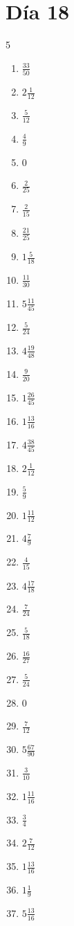 \documentclass[12pt]{article}
\begin{document}
\section*{Día 18}
\begin{multicols}{5}\begin{enumerate}
\item $ \frac{33}{50} $
\item $ 2 \frac{1}{12} $
\item $ \frac{5}{12} $
\item $ \frac{4}{9} $
\item $ 0 $
\item $ \frac{2}{25} $
\item $ \frac{2}{15} $
\item $ \frac{21}{25} $
\item $ 1 \frac{5}{18} $
\item $ \frac{11}{30} $
\item $ 5 \frac{11}{45} $
\item $ \frac{5}{24} $
\item $ 4 \frac{19}{48} $
\item $ \frac{9}{20} $
\item $ 1 \frac{26}{45} $
\item $ 1 \frac{13}{16} $
\item $ 4 \frac{38}{45} $
\item $ 2 \frac{1}{12} $
\item $ \frac{5}{9} $
\item $ 1 \frac{11}{12} $
\item $ 4 \frac{7}{9} $
\item $ \frac{4}{15} $
\item $ 4 \frac{17}{18} $
\item $ \frac{7}{24} $
\item $ \frac{5}{18} $
\item $ \frac{16}{27} $
\item $ \frac{5}{24} $
\item $ 0 $
\item $ \frac{7}{12} $
\item $ 5 \frac{67}{90} $
\item $ \frac{3}{10} $
\item $ 1 \frac{11}{16} $
\item $ \frac{3}{4} $
\item $ 2 \frac{7}{12} $
\item $ 1 \frac{13}{16} $
\item $ 1 \frac{1}{9} $
\item $ 5 \frac{13}{16} $

\end{enumerate}
\end{multicols}
\end{document}
